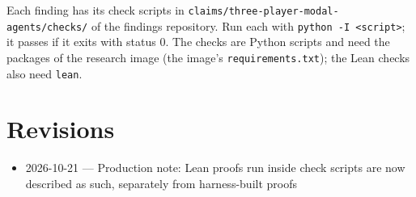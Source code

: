 \documentclass{article}
\begin{document}
Each finding has its check scripts in \texttt{claims/three-player-modal-agents/checks/} of the findings repository. Run each with \texttt{python -I <script>}; it passes if it exits with status 0. The checks are Python scripts and need the packages of the research image (the image's \texttt{requirements.txt}); the Lean checks also need \texttt{lean}.

\section{Revisions}

\begin{itemize}
\item 2026-10-21 --- Production note: Lean proofs run inside check scripts are now described as such, separately from harness-built proofs
\end{itemize}



\end{document}
